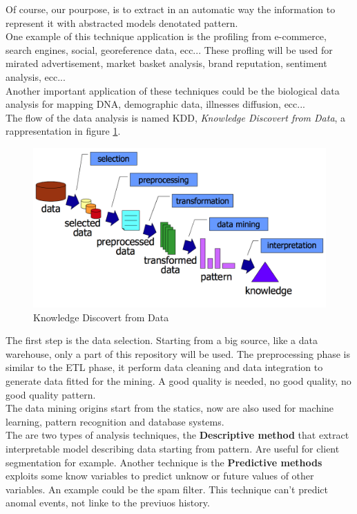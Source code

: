 \documentclass[12pt]{article}
\begin{document}
Of course, our pourpose, is to extract in an automatic way the information to represent it with abstracted models denotated pattern.\\
One example of this technique application is the profiling from e-commerce, search engines, social, georeference data, ecc... These profling will be used for mirated advertisement, market basket analysis, brand reputation, sentiment analysis, ecc...\\
Another important application of these techniques could be the biological data analysis for mapping DNA, demographic data, illnesses diffusion, ecc...\\
The flow of the data analysis is named KDD, \textit{Knowledge Discovert from Data}, a rappresentation in figure \ref{fig:kdd}.
\begin{figure}[h!]
  \centering
  \includegraphics[width=0.9\linewidth]{images/kdd.png}
  \caption{Knowledge Discovert from Data}
  \label{fig:kdd}
\end{figure}
The first step is the data selection. Starting from a big source, like a data warehouse, only a part of this repository will be used. The preprocessing phase is similar to the ETL phase, it perform data cleaning and data integration to generate data fitted for the mining. A good quality is needed, no good quality, no good quality pattern.\\
The data mining origins start from the statics, now are also used for machine learning, pattern recognition and database systems.\\
The are two types of analysis techniques, the \textbf{Descriptive method} that extract interpretable model describing data starting from pattern. Are useful for client segmentation for example. Another technique is the \textbf{Predictive methods} exploits some know variables to predict unknow or future values of other variables. An example could be the spam filter. This technique can't predict anomal events, not linke to the previuos history.\\
\end{document}
